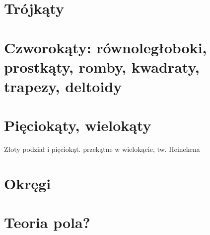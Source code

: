 
\section{Trójkąty}


\section{Czworokąty: równoległoboki, prostkąty, romby, kwadraty, trapezy, deltoidy}


\section{Pięciokąty, wielokąty}
Złoty podział i pięciokąt.
%
przekątne w wielokącie, tw. Heinekena %

\section{Okręgi}


\section{Teoria pola?}

